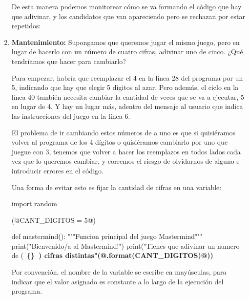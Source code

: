 \begin{enumerate}
De esta manera podemos monitorear cómo se va formando el código que hay que
adivinar, y los candidatos que van apareciendo pero se rechazan por estar
repetidos:


\item {\bf Mantenimiento:}
\label{str:mant}
Supongamos que queremos jugar el mismo juego, pero en lugar de hacerlo con un
número de cuatro cifras, adivinar uno de cinco. ¿Qué tendríamos que hacer para
cambiarlo?

Para empezar, habría que reemplazar el 4 en la línea 28 del programa por un
5, indicando que hay que elegir 5 dígitos al azar. Pero además, el ciclo en la
línea 40 también necesita cambiar la cantidad de veces que se va a ejecutar, 5
en lugar de 4. Y hay un lugar más, adentro del mensaje al usuario que indica las
instrucciones del juego en la línea 6.

El problema de ir cambiando estos números de a uno es que si quisiéramos volver
al programa de los 4 dígitos o quisiéramos cambiarlo por uno que juegue con 3,
tenemos que volver a hacer los reemplazos en todos lados cada vez que lo
queremos cambiar, y corremos el riesgo de olvidarnos de alguno e introducir
errores en el código.

Una forma de evitar esto es fijar la cantidad de cifras en una variable:

\begin{codigo-python-sn}
import random

(@CANT_DIGITOS = 5@)

def mastermind():
    """Funcion principal del juego Mastermind"""
    print("Bienvenido/a al Mastermind!")
    print("Tienes que adivinar un numero de (~\bfseries{\{\}}~) cifras distintas"(@.format(CANT_DIGITOS)@))
\end{codigo-python-sn}

Por convención, el nombre de la variable se escribe en mayúsculas, para indicar
que el valor asignado es constante a lo largo de la ejecución del programa.


\end{enumerate}
